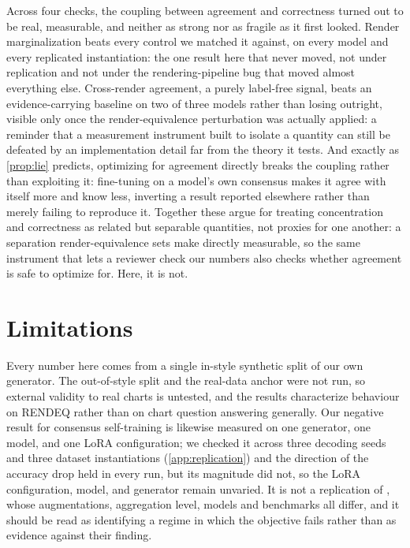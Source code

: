 \documentclass[11pt]{article}
\begin{document}
Across four checks, the coupling between agreement and correctness turned out to be real, measurable, and neither as strong nor as fragile as it first looked. Render marginalization beats every control we matched it against, on every model and every replicated instantiation: the one result here that never moved, not under replication and not under the rendering-pipeline bug that moved almost everything else. Cross-render agreement, a purely label-free signal, beats an evidence-carrying baseline on two of three models rather than losing outright, visible only once the render-equivalence perturbation was actually applied: a reminder that a measurement instrument built to isolate a quantity can still be defeated by an implementation detail far from the theory it tests. And exactly as \cref{prop:lie} predicts, optimizing for agreement directly breaks the coupling rather than exploiting it: fine-tuning on a model's own consensus makes it agree with itself more and know less, inverting a result reported elsewhere rather than merely failing to reproduce it. Together these argue for treating concentration and correctness as related but separable quantities, not proxies for one another: a separation render-equivalence sets make directly measurable, so the same instrument that lets a reviewer check our numbers also checks whether agreement is safe to optimize for. Here, it is not.

\section*{Limitations}

Every number here comes from a single in-style synthetic split of our own generator. The out-of-style split and the real-data anchor were not run, so external validity to real charts is untested, and the results characterize behaviour on RENDEQ rather than on chart question answering generally. Our negative result for consensus self-training is likewise measured on one generator, one model, and one LoRA configuration; we checked it across three decoding seeds and three dataset instantiations (\cref{app:replication}) and the direction of the accuracy drop held in every run, but its magnitude did not, so the LoRA configuration, model, and generator remain unvaried. It is not a replication of \citet{kaya2026efficient}, whose augmentations, aggregation level, models and benchmarks all differ, and it should be read as identifying a regime in which the objective fails rather than as evidence against their finding.
\end{document}
